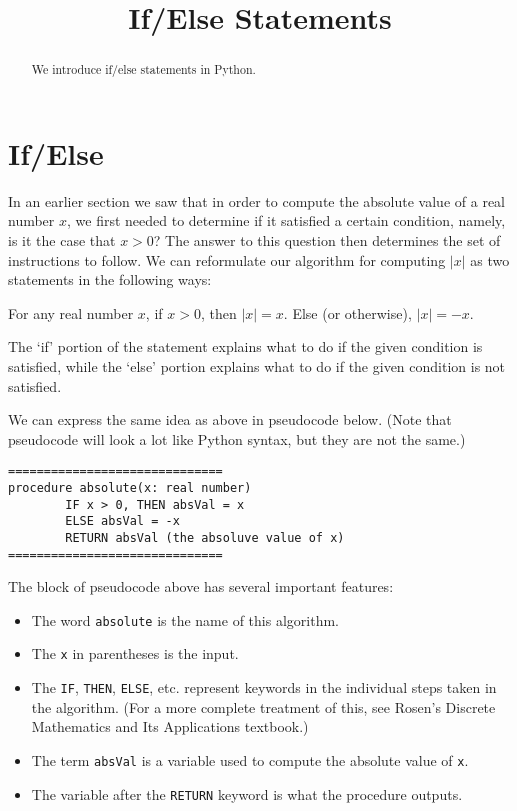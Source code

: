 \documentclass{ximera}
\title{If/Else Statements}
\begin{document}
\lstset{language=Python,frame=tb}
\begin{abstract}
We introduce if/else statements in Python.
\end{abstract}
\maketitle

\section{If/Else}

In an earlier section we saw that in order to compute the absolute value of a real number $x$, we first needed to determine if it satisfied a certain condition, namely, is it the case that $x>0$? The answer to this question then determines the set of instructions to follow. We can reformulate our algorithm for computing $|x|$ as two statements in the following ways:

For any real number $x$, if $x>0$, then $|x|=x$. Else (or otherwise), $|x|=-x$.

The `if' portion of the statement explains what to do if the given condition is satisfied, while the `else' portion explains what to do if the given condition is not satisfied.

We can express the same idea as above in pseudocode below. (Note that pseudocode will look a lot like Python syntax, but they are not the same.)

\begin{verbatim}
==============================
procedure absolute(x: real number)
        IF x > 0, THEN absVal = x
        ELSE absVal = -x
        RETURN absVal (the absoluve value of x)
==============================
\end{verbatim}

The block of pseudocode above has several important features:

\begin{itemize}
	\item The word \verb|absolute| is the name of this algorithm.
	\item The \verb|x| in parentheses is the input.
	\item The \verb|IF|, \verb|THEN|, \verb|ELSE|, etc. represent keywords in the individual steps taken in the algorithm. (For a more complete treatment of this, see Rosen's Discrete Mathematics and Its Applications textbook.)
	\item The term \verb|absVal| is a variable used to compute the absolute value of \verb|x|.
	\item The variable after the \verb|RETURN| keyword is what the procedure outputs.
\end{itemize}
\end{document}

